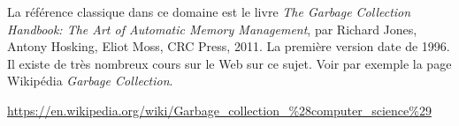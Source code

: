 \documentclass{../../../LaTeX/tdsimple}
\begin{document}
La référence classique dans ce domaine est le livre \emph{The Garbage
  Collection Handbook: The Art of Automatic Memory Management}, par
Richard Jones, Antony Hosking, Eliot Moss, CRC Press, 2011. La
première version date de 1996. Il existe de très nombreux cours sur le
Web sur ce sujet. Voir par exemple la page Wikipédia \emph{Garbage
  Collection}.
\begin{center}
  \url{https://en.wikipedia.org/wiki/Garbage_collection_%28computer_science%29}
\end{center}
\end{document}

